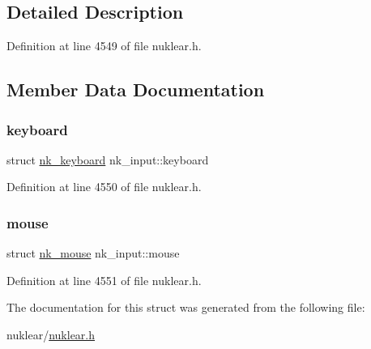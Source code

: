 \subsection{Detailed Description}


Definition at line 4549 of file nuklear.\+h.



\subsection{Member Data Documentation}
\mbox{\label{structnk__input_a07db4d8c752d4e9fcc7e18638dfa8740}} 
\subsubsection{\texorpdfstring{keyboard}{keyboard}}
{\footnotesize\ttfamily struct \mbox{\hyperlink{structnk__keyboard}{nk\+\_\+keyboard}} nk\+\_\+input\+::keyboard}



Definition at line 4550 of file nuklear.\+h.

\mbox{\label{structnk__input_ac34a784eebb90e3c839a8008f2127c61}} 
\subsubsection{\texorpdfstring{mouse}{mouse}}
{\footnotesize\ttfamily struct \mbox{\hyperlink{structnk__mouse}{nk\+\_\+mouse}} nk\+\_\+input\+::mouse}



Definition at line 4551 of file nuklear.\+h.



The documentation for this struct was generated from the following file\+:\begin{DoxyCompactItemize}
\item 
nuklear/\mbox{\hyperlink{nuklear_8h}{nuklear.\+h}}\end{DoxyCompactItemize}
